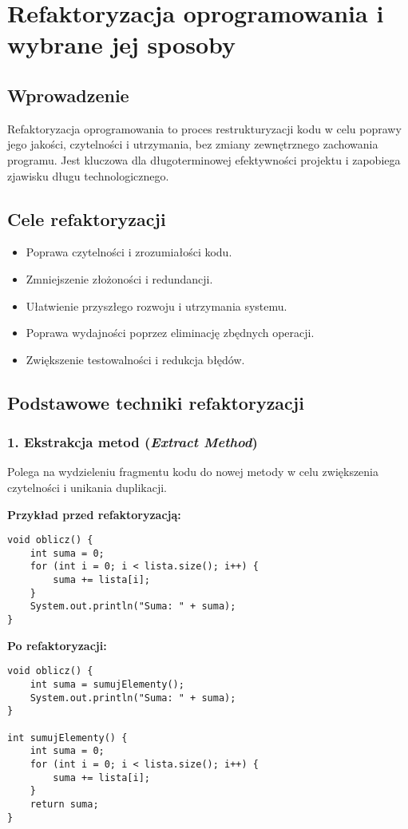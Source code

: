 \section{Refaktoryzacja oprogramowania i wybrane jej sposoby}

\subsection{Wprowadzenie}
Refaktoryzacja oprogramowania to proces restrukturyzacji kodu w celu poprawy jego jakości, czytelności i utrzymania, bez zmiany zewnętrznego zachowania programu. Jest kluczowa dla długoterminowej efektywności projektu i zapobiega zjawisku długu technologicznego.

\subsection{Cele refaktoryzacji}
\begin{itemize}
    \item Poprawa czytelności i zrozumiałości kodu.
    \item Zmniejszenie złożoności i redundancji.
    \item Ułatwienie przyszłego rozwoju i utrzymania systemu.
    \item Poprawa wydajności poprzez eliminację zbędnych operacji.
    \item Zwiększenie testowalności i redukcja błędów.
\end{itemize}

\subsection{Podstawowe techniki refaktoryzacji}

\subsubsection{1. Ekstrakcja metod (\textit{Extract Method})}
Polega na wydzieleniu fragmentu kodu do nowej metody w celu zwiększenia czytelności i unikania duplikacji.

\textbf{Przykład przed refaktoryzacją:}
\begin{verbatim}
void oblicz() {
    int suma = 0;
    for (int i = 0; i < lista.size(); i++) {
        suma += lista[i];
    }
    System.out.println("Suma: " + suma);
}
\end{verbatim}

\textbf{Po refaktoryzacji:}
\begin{verbatim}
void oblicz() {
    int suma = sumujElementy();
    System.out.println("Suma: " + suma);
}

int sumujElementy() {
    int suma = 0;
    for (int i = 0; i < lista.size(); i++) {
        suma += lista[i];
    }
    return suma;
}
\end{verbatim}

